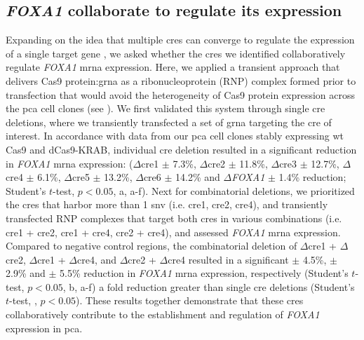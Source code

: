 \subsection{\emph{FOXA1}  collaborate to regulate its expression}

Expanding on the idea that multiple \glspl{cre} can converge to regulate the expression of a single target gene \cite{sallariConvergenceDispersedRegulatory2016,baileyNoncodingSomaticInherited2016,pennacchioEnhancersFiveEssential2013}, we asked whether the \glspl{cre} we identified collaboratively regulate \emph{FOXA1} \gls{mrna} expression.
Here, we applied a transient approach that delivers Cas9 protein:\gls{grna} as a ribonucleoprotein (RNP) complex formed prior to transfection that would avoid the heterogeneity of Cas9 protein expression across the \gls{pca} cell clones (see ).
We first validated this system through single \gls{cre} deletions, where we transiently transfected a set of \gls{grna} targeting the \gls{cre} of interest.
In accordance with data from our \gls{pca} cell clones stably expressing \gls{wt} Cas9 and dCas9-KRAB, individual \gls{cre} deletion resulted in a significant reduction in \emph{FOXA1} \gls{mrna} expression: ($\Delta$\gls{cre}1  $\pm$ 7.3\%, $\Delta$\gls{cre}2  $\pm$ 11.8\%, $\Delta$\gls{cre}3  $\pm$ 12.7\%, $\Delta$\gls{cre}4  $\pm$ 6.1\%, $\Delta$\gls{cre}5  $\pm$ 13.2\%, $\Delta$\gls{cre}6  $\pm$ 14.2\% and $\Delta$\emph{FOXA1}  $\pm$ 1.4\% reduction; Student's $t$-test, $p < 0.05$, a, a-f).
Next for combinatorial deletions, we prioritized the \glspl{cre} that harbor more than 1 \gls{snv} (i.e. \gls{cre}1, \gls{cre}2, \gls{cre}4), and transiently transfected RNP complexes that target both \glspl{cre} in various combinations (i.e. \gls{cre}1 + \gls{cre}2, \gls{cre}1 + \gls{cre}4, \gls{cre}2 + \gls{cre}4), and assessed \emph{FOXA1} \gls{mrna} expression.
Compared to negative control regions, the combinatorial deletion of $\Delta$\gls{cre}1 + $\Delta$\gls{cre}2, $\Delta$\gls{cre}1 + $\Delta$\gls{cre}4, and $\Delta$\gls{cre}2 + $\Delta$\gls{cre}4 resulted in a significant  $\pm$ 4.5\%,  $\pm$ 2.9\% and  $\pm$ 5.5\% reduction in \emph{FOXA1} \gls{mrna} expression, respectively (Student's $t$-test, $p<0.05$, b, a-f) a fold reduction greater than single \gls{cre} deletions (Student's $t$-test, , $p<0.05$).
These results together demonstrate that these \glspl{cre} collaboratively contribute to the establishment and regulation of \emph{FOXA1} expression in \gls{pca}.

